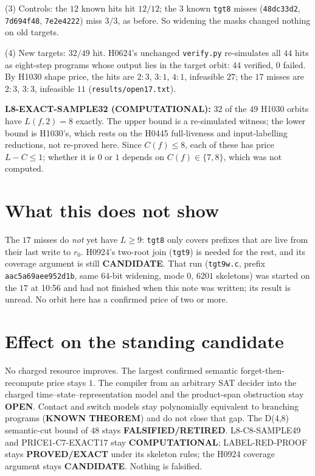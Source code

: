 \documentclass[11pt]{article}
\begin{document}
(3) Controls: the $12$ known hits hit $12/12$; the $3$ known \texttt{tgt8} misses (\texttt{48dc33d2}, \texttt{7d694f48}, \texttt{7e2e4222}) miss $3/3$, as before. So widening the masks changed nothing on old targets.

(4) New targets: $32/49$ hit. H0624's unchanged \texttt{verify.py} re-simulates all $44$ hits as eight-step programs whose output lies in the target orbit: $44$ verified, $0$ failed. By H1030 shape price, the hits are $2{:}3$, $3{:}1$, $4{:}1$, infeasible $27$; the $17$ misses are $2{:}3$, $3{:}3$, infeasible $11$ (\texttt{results/open17.txt}).

\textbf{L8-EXACT-SAMPLE32 (COMPUTATIONAL):} $32$ of the $49$ H1030 orbits have $L(f,2)=8$ exactly. The upper bound is a re-simulated witness; the lower bound is H1030's, which rests on the H0445 full-liveness and input-labelling reductions, not re-proved here. Since $C(f)\le8$, each of these has price $L-C\le1$; whether it is $0$ or $1$ depends on $C(f)\in\{7,8\}$, which was not computed.

\section*{What this does not show}
The $17$ misses do \emph{not} yet have $L\ge9$: \texttt{tgt8} only covers prefixes that are live from their last write to $r_0$. H0924's two-root join (\texttt{tgt9}) is needed for the rest, and its coverage argument is still \textbf{CANDIDATE}. That run (\texttt{tgt9w.c}, prefix \texttt{aac5a69aee952d1b}, same 64-bit widening, mode 0, $6201$ skeletons) was started on the $17$ at 10:56 and had not finished when this note was written; its result is unread. No orbit here has a confirmed price of two or more.

\section*{Effect on the standing candidate}
No charged resource improves. The largest confirmed semantic forget-then-recompute price stays $1$. The compiler from an arbitrary SAT decider into the charged time--state--representation model and the product-span obstruction stay \textbf{OPEN}. Contact and switch models stay polynomially equivalent to branching programs (\textbf{KNOWN THEOREM}) and do not close that gap. The D(4,8) semantic-cut bound of $48$ stays \textbf{FALSIFIED/RETIRED}. L8-C8-SAMPLE49 and PRICE1-C7-EXACT17 stay \textbf{COMPUTATIONAL}; LABEL-RED-PROOF stays \textbf{PROVED/EXACT} under its skeleton rules; the H0924 coverage argument stays \textbf{CANDIDATE}. Nothing is falsified.
\end{document}
